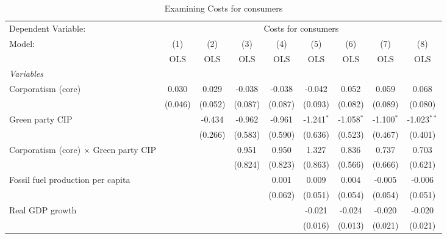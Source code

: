 
\begin{table}[htbp]
   \caption{Examining Costs for consumers}
   \centering
   \begin{tabular}{lcccccccc}
      \toprule
      Dependent Variable: & \multicolumn{8}{c}{Costs for consumers}\\
      Model:                                       & (1)     & (2)     & (3)     & (4)     & (5)          & (6)          & (7)          & (8)\\  
                                                   &  OLS    & OLS     & OLS     & OLS     & OLS          & OLS          & OLS          & OLS\\  
      \midrule
      \emph{Variables}\\
      Corporatism (core)                           & 0.030   & 0.029   & -0.038  & -0.038  & -0.042       & 0.052        & 0.059        & 0.068\\   
                                                   & (0.046) & (0.052) & (0.087) & (0.087) & (0.093)      & (0.082)      & (0.089)      & (0.080)\\   
      Green party CIP                              &         & -0.434  & -0.962  & -0.961  & -1.241$^{*}$ & -1.058$^{*}$ & -1.100$^{*}$ & -1.023$^{**}$\\   
                                                   &         & (0.266) & (0.583) & (0.590) & (0.636)      & (0.523)      & (0.467)      & (0.401)\\   
      Corporatism (core) $\times$ Green party CIP  &         &         & 0.951   & 0.950   & 1.327        & 0.836        & 0.737        & 0.703\\   
                                                   &         &         & (0.824) & (0.823) & (0.863)      & (0.566)      & (0.666)      & (0.621)\\   
      Fossil fuel production per capita            &         &         &         & 0.001   & 0.009        & 0.004        & -0.005       & -0.006\\   
                                                   &         &         &         & (0.062) & (0.051)      & (0.054)      & (0.054)      & (0.051)\\   
      Real GDP growth                              &         &         &         &         & -0.021       & -0.024       & -0.020       & -0.020\\   
                                                   &         &         &         &         & (0.016)      & (0.013)      & (0.021)      & (0.021)\\   

\end{tabular}
\end{table}
